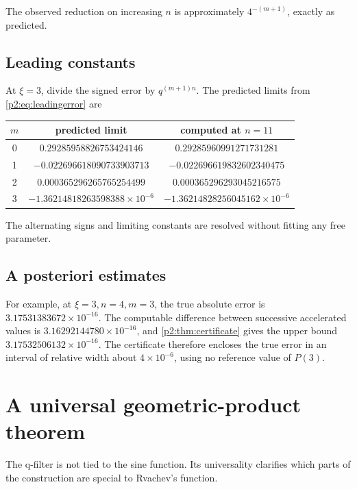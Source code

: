 \documentclass[11pt,oneside]{article}
\numberwithin{equation}{section}
\theoremstyle{definition}
\theoremstyle{remark}
\begin{document}
The observed reduction on increasing \(n\) is approximately
\(4^{-(m+1)}\), exactly as predicted.

\subsection{Leading constants}

At \(\xi=3\), divide the signed error by \(q^{(m+1)n}\). The predicted limits
from \eqref{p2:eq:leadingerror} are
\begin{center}
\begin{tabular}{ccc}
\toprule
\(m\)&predicted limit&computed at \(n=11\)\\
\midrule
0 & \(0.29285958826753424146\) & \(0.29285960991271731281\)\\
1 & \(-0.022696618090733903713\) & \(-0.022696619832602340475\)\\
2 & \(0.000365296265765254499\) & \(0.000365296293045216575\)\\
3 & \(-1.36214818263598388\times10^{-6}\) & \(-1.36214828256045162\times10^{-6}\)\\
\bottomrule
\end{tabular}
\end{center}
The alternating signs and limiting constants are resolved without fitting any
free parameter.

\subsection{A posteriori estimates}

For example, at \(\xi=3,n=4,m=3\), the true absolute error is
\(3.17531383672\times10^{-16}\). The computable difference between successive
accelerated values is \(3.16292144780\times10^{-16}\), and
\cref{p2:thm:certificate} gives the upper bound
\(3.17532506132\times10^{-16}\). The certificate therefore encloses the true
error in an interval of relative width about \(4\times10^{-6}\), using no
reference value of \(P(3)\).

\section{A universal geometric-product theorem}
\label{p2:sec:universal}

The q-filter is not tied to the sine function. Its universality clarifies which
parts of the construction are special to Rvachev's function.
\end{document}
